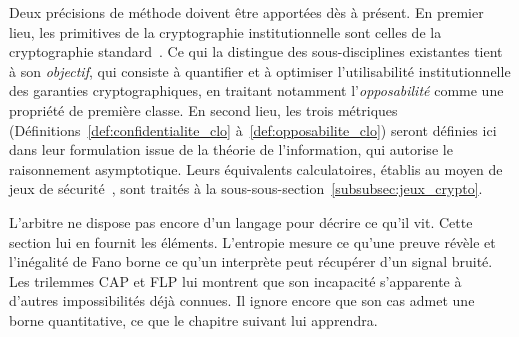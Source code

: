 \begin{sloppypar}
Deux pr\'ecisions de m\'ethode doivent \^etre apport\'ees d\`es \`a pr\'esent. En premier lieu, les primitives de la
cryptographie institutionnelle sont celles de la cryptographie standard~\cite{Goldreich01,DiffieHellman76}.
Ce qui la distingue des sous-disciplines existantes tient \`a son \emph{objectif}, qui consiste \`a quantifier et \`a optimiser l'utilisabilit\'e
institutionnelle des garanties cryptographiques, en traitant notamment
l'\emph{opposabilit\'e} comme une propri\'et\'e de premi\`ere classe. En second lieu,
les trois m\'etriques (D\'efinitions~\ref{def:confidentialite_clo} \`a~\ref{def:opposabilite_clo}) seront d\'efinies ici dans
leur formulation issue de la th\'eorie de l'information, qui autorise le raisonnement
asymptotique. Leurs \'equivalents calculatoires, \'etablis au moyen de jeux de
s\'ecurit\'e~\cite{GoldwasserMicali84,GMR88}, sont trait\'es \`a la sous-sous-section~\ref{subsubsec:jeux_crypto}.
\end{sloppypar}

\begin{boiteArbitre}
L'arbitre ne dispose pas encore d'un langage pour décrire ce qu'il vit. Cette section
lui en fournit les éléments. L'entropie mesure ce qu'une preuve révèle et
l'inégalité de Fano borne ce qu'un interprète peut
récupérer d'un signal bruité. Les trilemmes CAP et FLP lui montrent que son incapacité s'apparente à
d'autres impossibilités déjà connues. Il ignore encore que son cas admet une borne quantitative,
ce que le chapitre suivant lui apprendra.
\end{boiteArbitre}

